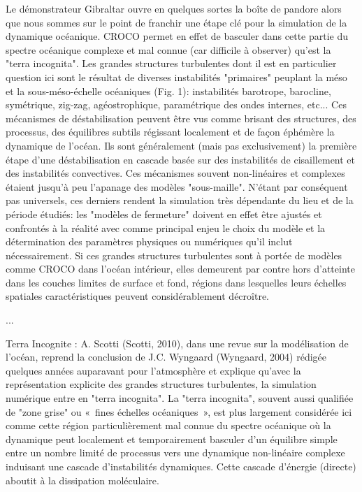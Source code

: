 Le démonstrateur Gibraltar ouvre en quelques sortes la boîte de pandore alors que nous sommes sur le point de franchir une étape clé pour la simulation de la dynamique océanique. CROCO permet en effet de basculer dans cette partie du spectre océanique complexe et mal connue (car difficile à observer) qu'est la "terra incognita". Les grandes structures turbulentes dont il est en particulier question ici sont le résultat de diverses instabilités "primaires" peuplant la méso et la sous-méso-échelle océaniques (Fig. 1): instabilités barotrope, barocline, symétrique, zig-zag, agéostrophique, paramétrique des ondes internes, etc... Ces mécanismes de déstabilisation peuvent être vus comme brisant des structures, des processus, des équilibres subtils régissant localement et de façon éphémère la dynamique de l'océan. Ils sont généralement (mais pas exclusivement) la première étape d'une déstabilisation en cascade basée sur des instabilités de cisaillement et des instabilités convectives. Ces mécanismes souvent non-linéaires et complexes étaient jusqu'à peu l'apanage des modèles "sous-maille". N'étant par conséquent pas universels, ces derniers rendent la simulation très dépendante du lieu et de la période étudiés: les "modèles de fermeture" doivent en effet être ajustés et confrontés à la réalité avec comme principal enjeu le choix du modèle et la détermination des paramètres physiques ou numériques qu’il inclut nécessairement. Si ces grandes structures turbulentes sont à portée de modèles comme CROCO dans l’océan intérieur, elles demeurent par contre hors d’atteinte dans les couches limites de surface et fond, régions dans lesquelles leurs échelles spatiales caractéristiques peuvent considérablement décroître.

...

Terra Incognite : A. Scotti (Scotti, 2010), dans une revue sur la modélisation de l'océan, reprend la conclusion de J.C. Wyngaard (Wyngaard, 2004) rédigée quelques années auparavant pour l'atmosphère et explique qu’avec la représentation explicite des grandes structures turbulentes, la simulation numérique entre en "terra incognita". La "terra incognita", souvent aussi qualifiée de "zone grise" ou « fines échelles océaniques », est plus largement considérée ici comme cette région particulièrement mal connue du spectre océanique où la dynamique peut localement et temporairement basculer d'un équilibre simple entre un nombre limité de processus vers une dynamique non-linéaire complexe induisant une cascade d'instabilités dynamiques. Cette cascade d’énergie (directe) aboutit à la dissipation moléculaire.

